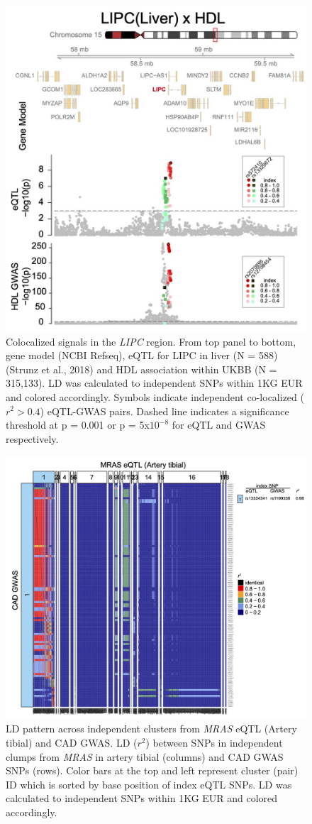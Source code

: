 \documentclass[11pt]{article}
\begin{document}
\begin{figure}[!ht]
  \centering
  \includegraphics[width=.7\textwidth]{figs/region_lipc.jpg}
  \caption{Colocalized signals in the \emph{LIPC} region. From top
    panel to bottom, gene model (NCBI Refseq), eQTL for LIPC in liver
    (N = 588) (Strunz et al., 2018) and HDL association within UKBB (N
    = 315,133). LD was calculated to independent SNPs within 1KG EUR
    and colored accordingly. Symbols indicate independent co-localized
    ($r^2> 0.4$) eQTL-GWAS pairs. Dashed line indicates a significance
    threshold at p = 0.001 or p = 5x$10^{-8}$ for eQTL and GWAS
    respectively.} 
\end{figure}

\begin{figure}[!ht]
  \centering
  \includegraphics[width=.7\textwidth]{figs/heatmap_mras.jpg}
  \caption{LD pattern across independent clusters from \emph{MRAS}
    eQTL (Artery tibial) and CAD GWAS. LD ($r^2$) between SNPs in
    independent clumps from \emph{MRAS} in artery tibial (columns) and
    CAD GWAS SNPs (rows). Color bars at the top and left represent
    cluster (pair) ID which is sorted by base position of index eQTL
    SNPs. LD was calculated to independent SNPs within 1KG EUR and
    colored accordingly.}
  \label{fig:ld1}
\end{figure}
\end{document}
